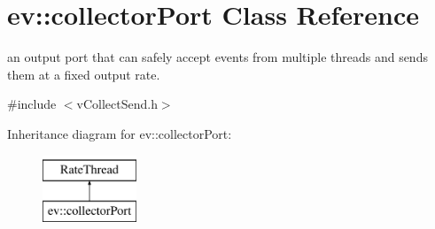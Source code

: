 \hypertarget{classev_1_1collectorPort}{}\section{ev\+:\+:collector\+Port Class Reference}
\label{classev_1_1collectorPort}


an output port that can safely accept events from multiple threads and sends them at a fixed output rate.  




{\ttfamily \#include $<$v\+Collect\+Send.\+h$>$}

Inheritance diagram for ev\+:\+:collector\+Port\+:\begin{figure}[H]
\begin{center}
\leavevmode
\includegraphics[height=2.000000cm]{classev_1_1collectorPort}
\end{center}
\end{figure}
